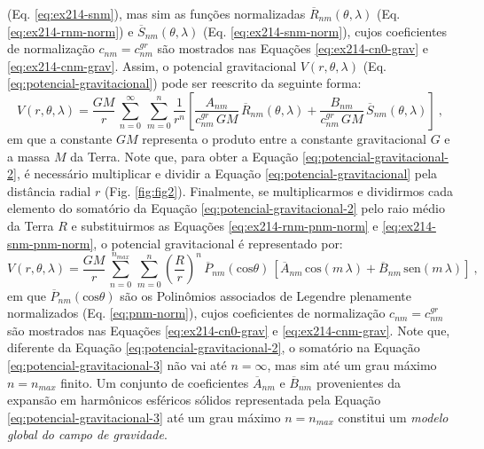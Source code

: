 \documentclass[10pt,a4paper,fleqn]{article}
\begin{document}
(Eq. \ref{eq:ex214-snm}), mas sim as fun\c{c}\~{o}es normalizadas
$\overline{R}_{nm}(\theta,\lambda)$ (Eq. \ref{eq:ex214-rnm-norm}) e
$\overline{S}_{nm}(\theta,\lambda)$ (Eq. \ref{eq:ex214-snm-norm}), cujos
coeficientes de normaliza\c{c}\~{a}o $c_{nm} = c_{nm}^{gr}$ s\~{a}o mostrados
nas Equa\c{c}\~{o}es \ref{eq:ex214-cn0-grav} e \ref{eq:ex214-cnm-grav}.
Assim, o potencial gravitacional $V(r, \theta, \lambda)$ (Eq. 
\ref{eq:potencial-gravitacional}) pode ser reescrito da seguinte forma:
\begin{equation}
V(r, \theta, \lambda) = \frac{GM}{r} \, \sum_{n=0}^{\infty} \, \sum_{m=0}^{n} 
\frac{1}{r^{n}} \left[ 
\frac{A_{nm}}{c_{nm}^{gr} \, GM} \, \overline{R}_{nm}(\theta, \lambda) +
\frac{B_{nm}}{c_{nm}^{gr} \, GM} \, \overline{S}_{nm}(\theta, \lambda)
\right] \: ,
\label{eq:potencial-gravitacional-2}
\end{equation}
em que a constante $GM$ representa o produto entre a constante gravitacional $G$ 
e a massa $M$ da Terra. Note que, para obter a Equa\c{c}\~{a}o 
\ref{eq:potencial-gravitacional-2}, \'{e} necess\'{a}rio multiplicar e dividir 
a Equa\c{c}\~{a}o \ref{eq:potencial-gravitacional} pela dist\^{a}ncia radial $r$
(Fig. \ref{fig:fig2}).
Finalmente, se multiplicarmos e dividirmos cada elemento
do somat\'{o}rio da Equa\c{c}\~{a}o \ref{eq:potencial-gravitacional-2}
pelo raio m\'{e}dio da Terra $R$ e substituirmos as Equa\c{c}\~{o}es
\ref{eq:ex214-rnm-pnm-norm} e \ref{eq:ex214-snm-pnm-norm}, 
o potencial gravitacional \'{e} representado por:
\begin{equation}
V(r, \theta, \lambda) = \frac{GM}{r} \, 
\sum_{n=0}^{n_{max}} \, \sum_{m=0}^{n} 
\left(\frac{R}{r}\right)^{n} \, \overline{P}_{nm}(\text{cos}\theta) \, \left[ 
\overline{A}_{nm} \, \text{cos}(m \, \lambda) +
\overline{B}_{nm} \, \text{sen}(m \, \lambda)
\right] \: ,
\label{eq:potencial-gravitacional-3}
\end{equation}
em que $\overline{P}_{nm}(\text{cos}\theta)$ s\~{a}o os Polin\^{o}mios associados 
de Legendre plenamente normalizados (Eq. \ref{eq:pnm-norm}), cujos
coeficientes de normaliza\c{c}\~{a}o $c_{nm} = c_{nm}^{gr}$ s\~{a}o mostrados
nas Equa\c{c}\~{o}es \ref{eq:ex214-cn0-grav} e \ref{eq:ex214-cnm-grav}.
Note que, diferente da Equa\c{c}\~{a}o \ref{eq:potencial-gravitacional-2},
o somat\'{o}rio na Equa\c{c}\~{a}o \ref{eq:potencial-gravitacional-3}
n\~{a}o vai at\'{e} $n = \infty$, mas sim at\'{e} um grau m\'{a}ximo 
$n = n_{max}$ finito.
Um conjunto de coeficientes $\overline{A}_{nm}$ e $\overline{B}_{nm}$
provenientes da expans\~{a}o em harm\^{o}nicos esf\'{e}ricos 
s\'{o}lidos representada pela Equa\c{c}\~{a}o \ref{eq:potencial-gravitacional-3}
at\'{e} um grau m\'{a}ximo $n = n_{max}$ constitui um \textit{modelo global do
campo de gravidade}.
\end{document}

